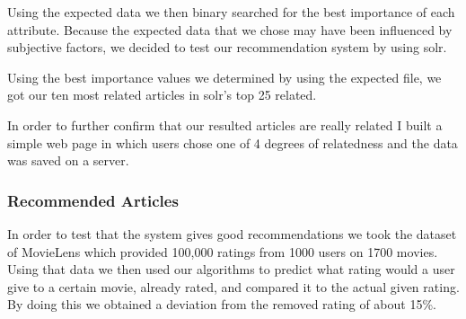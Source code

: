 Using the expected data we then binary searched for the best importance of each attribute.
Because the expected data that we chose may have been influenced by subjective factors, we decided to test our recommendation system by using solr.

Using the best importance values we determined by using the expected file, we got our ten most related articles in solr's top 25 related.

In order to further confirm that our resulted articles are really related I built a simple web page in which users chose one of 4 degrees of relatedness and the data was saved on a server.

\subsubsection{Recommended Articles}
\label{sec:recommended-articles}
In order to test that the system gives good recommendations we took the dataset of MovieLens which provided 100,000 ratings from 1000 users on 1700 movies. Using that data we then used our algorithms to predict what rating would a user give to a certain movie, already rated, and compared it to the actual given rating. By doing this we obtained a deviation from the removed rating of about 15\%.